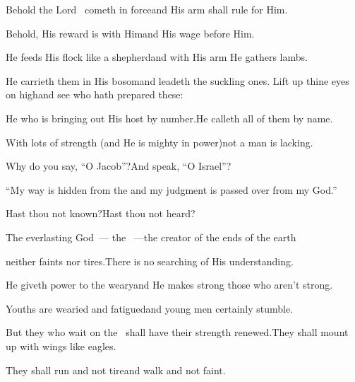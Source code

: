 \begin{inparaenum}
  \pb{} Behold the Lord \lord\ cometh in force\pa{}and His arm shall rule for Him.%

  \pb{}Behold, His reward is with Him\pa{}and His wage before Him.%

  \pb{} He feeds His flock like a shepherd\pa{}and with His arm He gathers lambs.%

  \pb{}He carrieth them in His bosom\pa{}and leadeth the suckling ones.%
  \pa{} Lift up thine eyes on high\pa{}and see who hath prepared these:%

  \pa{}He who is bringing out His host by number.\pa{}He calleth all of them by name.%

  \pa{}With lots of strength (and He is mighty in power)\pa{}not a man is lacking.%

  \pb{} Why do you say, ``O Jacob''?\pa{}And speak, ``O Israel''?%

  \pb{}``My way is hidden from the \lord\pa{}and my judgment is passed over from my God.''%

  \pb{} Hast thou not known?\pa{}Hast thou not heard?%

  \pb{}The everlasting God~--- the \lord~---\pa{}the creator of the ends of the earth%

  \pb{}neither faints nor tires.\pa{}There is no searching of His understanding.%

  \pb{} He giveth power to the weary\pa{}and He makes strong those who aren't strong.%

  \pb{} Youths are wearied and fatigued\pa{}and young men certainly stumble.%

  \pb{} But they who wait on the \lord\ shall have their strength renewed.\pa{}They shall mount up with wings like eagles.%

  \pb{}They shall run and not tire\pa{}and walk and not faint.%
\end{inparaenum}
